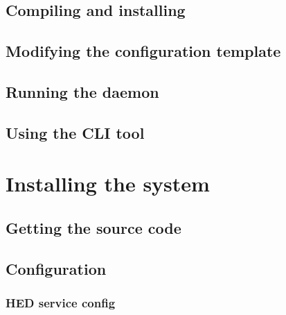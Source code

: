 \documentclass{book}
\begin{document}

\section{Compiling and installing} %
\label{sec:compiling_and_installing}


\section{Modifying the configuration template} %
\label{sec:modifying_the_configuration_template}


\section{Running the daemon} %
\label{sec:running_the_daemon}


\section{Using the CLI tool} %
\label{sec:using_the_cli_tool}



\chapter{Installing the system} %
\label{cha:installing_the_system}

\section{Getting the source code} %
\label{sec:getting_the_source_code}


\section{Configuration} %
\label{sec:configuration}

\subsection{HED service config} %
\label{sub:hed_service_config}
\end{document}
